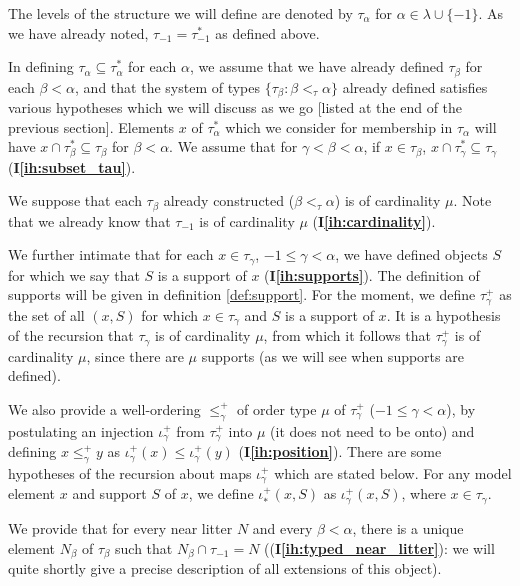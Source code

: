 \documentclass[112pt]{article}
\theoremstyle{definition}
\theoremstyle{remark}
\newcommand{\ihref}[1]{(\textbf{I\ref{#1}})}
\begin{document}
The levels of the structure we will define are denoted by $\tau_\alpha$ for \newline $\alpha \in \lambda \cup \{-1\}$.  As we have already noted, $\tau_{-1}=\tau^*_{-1}$ as defined above.

In defining $\tau_\alpha \subseteq \tau^*_\alpha$ for each $\alpha$, we assume that we have already defined $\tau_\beta$ for each $\beta<\alpha$, and that the system of types $\{\tau_\beta:\beta <_\tau \alpha\}$ already defined satisfies various hypotheses which we will discuss as we go [listed at the end of the previous section].
Elements $x$ of $\tau^*_\alpha$ which we consider for membership in $\tau_\alpha$ will have $x \cap \tau^*_\beta \subseteq \tau_\beta$ for $\beta<\alpha$.  We assume that for $\gamma<\beta<\alpha$, if $x \in \tau_\beta$, $x \cap \tau^*_\gamma \subseteq \tau_\gamma$ \ihref{ih:subset_tau}.

We suppose that each $\tau_\beta$ already constructed ($\beta<_\tau \alpha$) is of cardinality $\mu$.  Note that we already know that
$\tau_{-1}$ is of cardinality $\mu$ \ihref{ih:cardinality}.


We further intimate that for each $x \in \tau_\gamma$, $-1\leq \gamma<\alpha$, we have defined objects $S$ for which we say that $S$ is a support of $x$ \ihref{ih:supports}.  The definition of supports will be given in definition \ref{def:support}.  For the moment, we define $\tau_\gamma^+$ as the set of all $(x,S)$ for which $x \in \tau_\gamma$ and $S$ is a support of $x$.  It is a hypothesis of the recursion
that $\tau_\gamma$ is of cardinality $\mu$, from which it follows that  $\tau^+_\gamma$ is of cardinality $\mu$, since there are $\mu$ supports (as we will see when supports are defined).

We also provide a well-ordering $\leq^+_\gamma$ of order type $\mu$ of $\tau_\gamma^+$ ($-1 \leq \gamma <\alpha$), by postulating an injection $\iota^+_\gamma$ from $\tau_\gamma^+$ into $\mu$ (it does not need to be onto) and defining $x \leq^+_\gamma y$ as $\iota^+_\gamma(x) \leq \iota^+_\gamma(y)$ \ihref{ih:position}.   There are some hypotheses of the recursion about maps $\iota^+_\gamma$ which are stated below.   For any model element $x$ and support $S$ of $x$, we define $\iota^+_*(x,S)$ as $\iota^+_\gamma(x,S)$, where $x \in \tau_\gamma$.


We provide that for every near litter $N$ and every $\beta<\alpha$, there is a unique element $N_\beta$ of $\tau_\beta$ such that $N_\beta \cap \tau_{-1}=N$ (\ihref{ih:typed_near_litter}:  we will quite shortly give a precise description of all extensions of this object).
\end{document}
